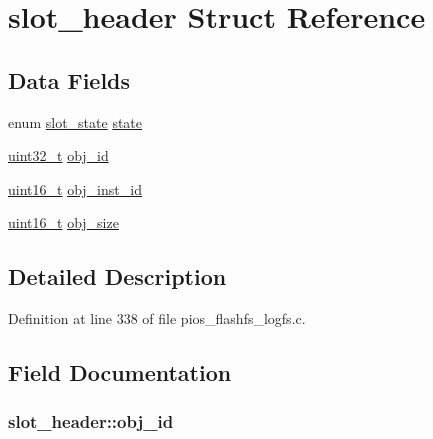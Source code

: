 \hypertarget{structslot__header}{\section{slot\-\_\-header Struct Reference}
\label{structslot__header}
}
\subsection*{Data Fields}
\begin{DoxyCompactItemize}
\item 
enum \hyperlink{group___p_i_o_s___f_l_a_s_h_f_s_ga7df58e5fca7cec32767a0481da453e74}{slot\-\_\-state} \hyperlink{structslot__header_a5bfcf2f73ad00e1f416dd3b9a557b7a3}{state}
\item 
\hyperlink{stdint_8h_a435d1572bf3f880d55459d9805097f62}{uint32\-\_\-t} \hyperlink{structslot__header_aa004e58ab0609d8c239530017730b5c1}{obj\-\_\-id}
\item 
\hyperlink{stdint_8h_a273cf69d639a59973b6019625df33e30}{uint16\-\_\-t} \hyperlink{structslot__header_a61928fad0e752c278fb8485aa199240d}{obj\-\_\-inst\-\_\-id}
\item 
\hyperlink{stdint_8h_a273cf69d639a59973b6019625df33e30}{uint16\-\_\-t} \hyperlink{structslot__header_ada9f3086c54142732ee8e98e88a65d3a}{obj\-\_\-size}
\end{DoxyCompactItemize}


\subsection{Detailed Description}


Definition at line 338 of file pios\-\_\-flashfs\-\_\-logfs.\-c.



\subsection{Field Documentation}
\hypertarget{structslot__header_aa004e58ab0609d8c239530017730b5c1}{
\subsubsection[{obj\-\_\-id}]{ slot\-\_\-header\-::obj\-\_\-id}}\label{structslot__header_aa004e58ab0609d8c239530017730b5c1}


